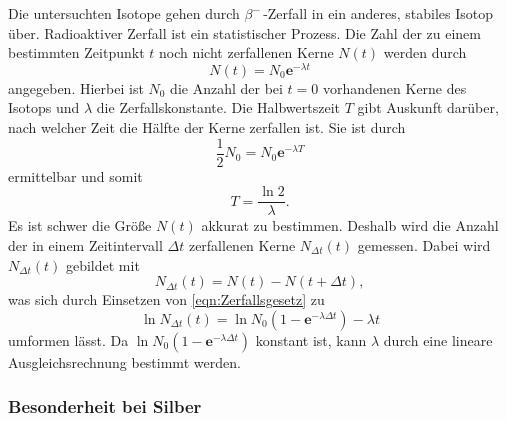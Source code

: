 Die untersuchten Isotope gehen durch $\beta^-\,$-Zerfall in ein anderes, stabiles Isotop über.
Radioaktiver Zerfall ist ein statistischer Prozess.
Die Zahl der zu einem bestimmten Zeitpunkt $t$ noch nicht zerfallenen Kerne $N(t)$ werden durch
\begin{equation}\label{eqn:Zerfallsgesetz}
    N(t) = N_0 \textbf{e}^{-\lambda t}
\end{equation}
angegeben. Hierbei ist $N_0$ die Anzahl der bei $t=0$ vorhandenen Kerne des Isotops und $\lambda$ die Zerfallskonstante.	
Die Halbwertszeit $T$ gibt Auskunft darüber, nach welcher Zeit die Hälfte der Kerne zerfallen ist.
Sie ist durch
\begin{equation*}
    \frac{1}{2}N_0 = N_0 \textbf{e}^{-\lambda T}
\end{equation*}
ermittelbar und somit 
\begin{equation}\label{eq:T}
    T = \frac{\ln 2}{\lambda}.
\end{equation}
Es ist schwer die Größe $N(t)$ akkurat zu bestimmen. 
Deshalb wird die Anzahl der in einem Zeitintervall $\Delta t$ zerfallenen Kerne $N_{\Delta t}(t)$ gemessen.
Dabei wird $N_{\Delta t}(t)$ gebildet mit
\begin{equation*}
    N_{\Delta t}(t) = N(t) - N(t + \Delta t),
\end{equation*}
was sich durch Einsetzen von \eqref{eqn:Zerfallsgesetz} zu
\begin{equation*}%
    \ln N_{\Delta t}(t) = \ln{N_0}\left(1 - \textbf{e}^{-\lambda\Delta t}\right) - \lambda t
\end{equation*}
umformen lässt.
Da $\ln N_0(1 - \textbf{e}^{-\lambda\Delta t})$ konstant ist, kann $\lambda$ durch eine lineare Ausgleichsrechnung bestimmt werden.

\subsubsection{Besonderheit bei Silber}
\label{subsubsec:Besonderheit bei Silber}

